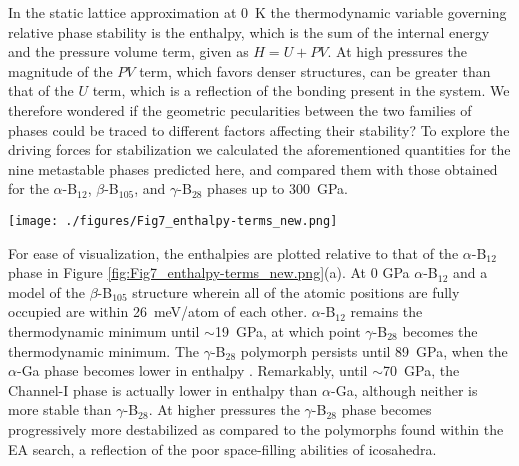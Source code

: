 \documentclass[reprint,aps,prl,twocolumn,letterpaper]{revtex4-2}
\newlength{\pagewidth}
\begin{document}
In the static lattice approximation at 0~K the thermodynamic variable governing relative phase stability is the enthalpy, which is the sum of the internal energy and the pressure volume term, given as $H=U+PV$. At high pressures the magnitude of the $PV$ term, which favors denser structures, can be greater than that of the $U$ term, which is a reflection of the bonding present in the system. We therefore wondered if the geometric pecularities between the two families of phases could be traced to different factors affecting their stability? To explore the driving forces for stabilization we calculated the aforementioned quantities for the nine metastable phases predicted here, and compared them with those obtained for the $\alpha$-B$_{12}$, $\beta$-B$_{105}$, and $\gamma$-B$_{28}$ phases up to 300~GPa. 


\begin{figure*}
\begin{center}
\texttt{[image: ./figures/Fig7\_enthalpy-terms\_new.png]}
\end{center}
\caption{Enthalpies of select phases of boron, including those listed in Table 1, with respect to that of $\alpha$-B$_{12}$ as a function of pressure. (b) The internal energy of these boron phases relative to $\alpha$-B$_{12}$. (c) The $PV$ contribution to the enthalpy of these boron phases relative to that of the $\alpha$-Ga polymorph. Channel-based phases tend to have a lower internal energy, while those based on $\alpha$-Ga have smaller $PV$ contributions to the enthalpy.
\label{fig:Fig7_enthalpy-terms_new.png}}
\end{figure*}

For ease of visualization, the enthalpies are plotted relative to that of the $\alpha$-B$_{12}$ phase in Figure \ref{fig:Fig7_enthalpy-terms_new.png}(a). At 0 GPa $\alpha$-B$_{12}$ and a model of the  $\beta$-B$_{105}$ structure wherein all of the atomic positions are fully occupied are within 26~meV/atom of each other. $\alpha$-B$_{12}$ remains the thermodynamic minimum until $\sim$19~GPa, at which point $\gamma$-B$_{28}$ becomes the thermodynamic minimum. The $\gamma$-B$_{28}$ polymorph persists until 89~GPa, when the $\alpha$-Ga phase becomes lower in enthalpy \cite{Oganov:2009}. Remarkably, until $\sim$70~GPa, the Channel-I phase is actually lower in enthalpy than $\alpha$-Ga, although neither is more stable than $\gamma$-B$_{28}$.  At higher pressures the $\gamma$-B$_{28}$ phase becomes progressively more destabilized as compared to the polymorphs found within the EA search, a reflection of the poor space-filling abilities of icosahedra. 
\end{document}
